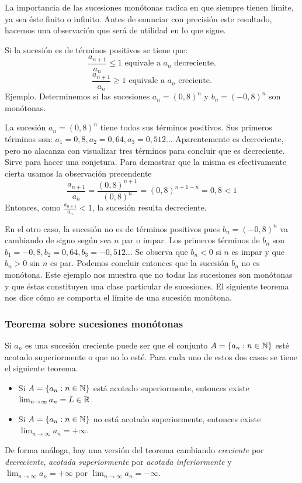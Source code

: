 \documentclass[../teoria.root.tex]{subfiles}
\begin{document}
La importancia de las sucesiones monótonas radica en que siempre tienen límite, ya sea éste finito o infinito.
Antes de enunciar con precisión este resultado, hacemos una observación que será de utilidad en lo que sigue.

Si la sucesión es de términos positivos se tiene que:
\[\frac{a_{n+1}}{a_n}\leq1\text{ equivale a \(a_n\) decreciente.}\]
\[\frac{a_{n+1}}{a_n}\geq1\text{ equivale a \(a_n\) creciente.}\]
Ejemplo.
Determinemos si las sucesiones \(a_n=(0,8)^n\) y \(b_n=(-0,8)^n\) son monótonas.

La sucesión \(a_n=(0,8)^n\) tiene todos sus términos positivos.
Sus primeros términos son: \(a_1=0,8, a_2=0,64, a_3=0,512\dots\) Aparentemente es decreciente, pero no alacanza con visualizar tres términos para concluir que es decreciente.
Sirve para hacer una conjetura.
Para demostrar que la misma es efectivamente cierta usamos la observación precendente
\[\frac{a_{n+1}}{a_n}=\frac{(0,8)^{n+1}}{(0,8)^n}=(0,8)^{n+1-n}=0,8<1\]
Entonces, como \(\frac{a_{n+1}}{a_n}<1\), la sucesión resulta decreciente.

En el otro caso, la sucesión no es de términos positivos pues \(b_n=(-0,8)^n\) va cambiando de signo según sea \(n\) par o impar.
Los primeros términos de \(b_n\) son \(b_1=-0,8, b_2=0,64, b_3=-0,512\dots\) Se observa que \(b_n<0\) si \(n\) es impar y que \(b_n>0\) sin \(n\) es par.
Podemos concluir entonces que la sucesión \(b_n\) no es monótona.
Este ejemplo nos muestra que no todas las sucesiones son monótonas y que éstas constituyen una clase particular de sucesiones.
El siguiente teorema nos dice cómo se comporta el límite de una sucesión monótona.
\subsubsection{Teorema sobre sucesiones monótonas}
Si \(a_n\) es una sucesión creciente puede ser que el conjunto \(A=\{a_n:n\in\mathbb{N}\}\) esté acotado superiormente o que no lo esté.
Para cada uno de estos dos casos se tiene el siguiente teorema.
\begin{itemize}
    \item Si \(A=\{a_n:n\in\mathbb{N}\}\) está acotado superiormente, entonces existe \(\lim_{n\to\infty}a_n=L\in\mathbb{R}\).
    \item Si \(A=\{a_n:n\in\mathbb{N}\}\) no está acotado superiormente, entonces existe \(\lim_{n\to\infty}a_n=+\infty\).
\end{itemize}
De forma análoga, hay una versión del teorema cambiando \textit{creciente} por \textit{decreciente}, \textit{acotada superiormente} por \textit{acotada inferiormente} y \(\lim_{n\to\infty}a_n=+\infty\) por \(\lim_{n\to\infty}a_n=-\infty\).
\end{document}
